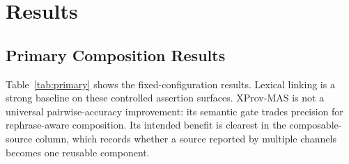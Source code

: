 \documentclass[graybox]{svmult}
\begin{document}
\section{Results}

\subsection{Primary Composition Results}

Table~\ref{tab:primary} shows the fixed-configuration results. Lexical linking is a strong baseline on these controlled assertion surfaces. XProv-MAS is not a universal pairwise-accuracy improvement: its semantic gate trades precision for rephrase-aware composition. Its intended benefit is clearest in the composable-source column, which records whether a source reported by multiple channels becomes one reusable component.
\end{document}
